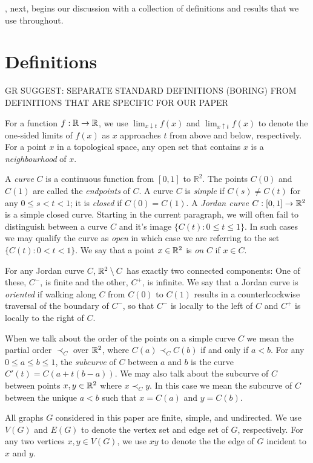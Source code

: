 \documentclass{patmorin}
\begin{document}
, next, begins our discussion with a collection of
definitions and results that we use throughout.


\section{Definitions}

GR SUGGEST: SEPARATE STANDARD DEFINITIONS (BORING) FROM DEFINITIONS THAT ARE
SPECIFIC FOR OUR PAPER

For a function $f:\mathbb{R}\to\mathbb{R}$, we use $\lim_{x\downarrow t} f(x)$ and
$\lim_{x\uparrow t} f(x)$ to denote the one-sided limits of $f(x)$
as $x$ approaches $t$ from above and below, respectively.  For a
point $x$ in a topological space, any open set that contains $x$ is a
\emph{neighbourhood} of $x$.  

A \emph{curve} $C$ is a continuous function from $[0,1]$
to $\mathbb{R}^2$.  The points $C(0)$ and $C(1)$ are called the
\emph{endpoints} of $C$.  A curve $C$ is \emph{simple} if $C(s)\neq C(t)$
for any $0\le s<t< 1$; it is \emph{closed} if $C(0)=C(1)$.  A \emph{Jordan
curve} $C:[0,1]\to\mathbb{R}^2$ is a simple closed curve.  Starting in the current
paragraph, we will often fail to distinguish between a curve $C$ and it's
image $\{C(t):0\le t\le 1\}$.  In such cases we may qualify the curve as
\emph{open} in which case we are referring to the set $\{C(t):0< t< 1\}$.
We say that a point $x\in\mathbb{R}^2$ is \emph{on} $C$ if $x\in C$.  

For any Jordan curve $C$, $\mathbb{R}^2\setminus C$ has exactly two connected
components: One of these, $C^-$, is finite and the other, $C^+$, is
infinite.  We say that a Jordan curve is \emph{oriented} if walking
along $C$ from $C(0)$ to $C(1)$ results in a counterlcockwise traversal
of the boundary of $C^-$, so that $C^-$ is locally to the left of $C$
and $C^+$ is locally to the right of $C$.

When we talk about the order of the points on a simple curve $C$ we
mean the partial order $\prec_C$ over $\mathbb{R}^2$, where $C(a)\prec_C C(b)$
if and only if $a<b$.  For any $0\le a\le b\le 1$, the \emph{subcurve}
of $C$ between $a$ and $b$ is the curve $C'(t)=C(a+t(b-a))$.  We may also
talk about the subcurve of $C$ between points $x,y\in\mathbb{R}^2$ where $x\prec_C
y$. In this case we mean the subcurve of $C$ between the unique $a< b$
such that $x=C(a)$ and $y=C(b)$.

All graphs $G$ considered in this paper are finite, simple, and
undirected.   We use $V(G)$ and $E(G)$ to denote the vertex set and edge
set of $G$, respectively. For any two vertices $x,y\in V(G)$, we use $xy$
to denote the the edge of $G$ incident to $x$ and $y$.
\end{document}
